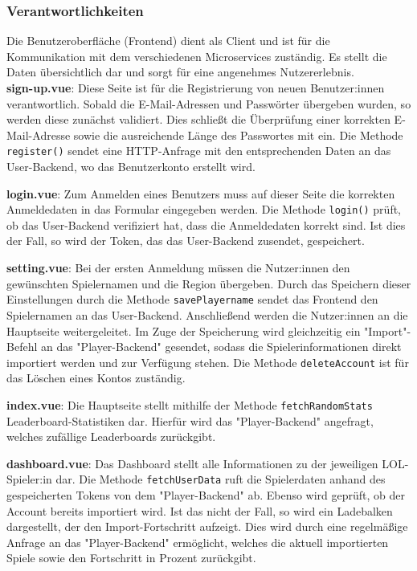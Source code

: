 \subsubsection{Verantwortlichkeiten}

Die Benutzeroberfläche (Frontend) dient als Client und ist für die Kommunikation mit dem verschiedenen Microservices zuständig. Es stellt die Daten übersichtlich dar und sorgt für eine
angenehmes Nutzererlebnis. \\

\textbf{sign-up.vue}: Diese Seite ist für die Registrierung von neuen Benutzer:innen verantwortlich. Sobald die E-Mail-Adressen und Passwörter übergeben wurden, so werden diese zunächst
validiert. Dies schließt die Überprüfung einer korrekten E-Mail-Adresse sowie die ausreichende Länge des Passwortes mit ein. Die Methode \verb|register()| sendet eine HTTP-Anfrage mit den 
entsprechenden Daten an das User-Backend, wo das Benutzerkonto erstellt wird.
\newline

\textbf{login.vue}: Zum Anmelden eines Benutzers muss auf dieser Seite die korrekten Anmeldedaten in das Formular eingegeben werden. Die Methode \verb|login()| prüft, ob das User-Backend
verifiziert hat, dass die Anmeldedaten korrekt sind. Ist dies der Fall, so wird der Token, das das User-Backend zusendet, gespeichert. 
\newline

\textbf{setting.vue}: Bei der ersten Anmeldung müssen die Nutzer:innen den gewünschten Spielernamen und die Region übergeben. Durch das Speichern dieser Einstellungen durch die Methode \verb|savePlayername|
sendet das Frontend den Spielernamen an das User-Backend. Anschließend werden die Nutzer:innen an die Hauptseite weitergeleitet. Im Zuge der Speicherung wird gleichzeitig ein "Import"-Befehl
an das "Player-Backend" gesendet, sodass die Spielerinformationen direkt importiert werden und zur Verfügung stehen. Die Methode \verb|deleteAccount| ist für das Löschen eines Kontos zuständig.
\newline

\textbf{index.vue}: Die Hauptseite stellt mithilfe der Methode \verb|fetchRandomStats| Leaderboard-Statistiken dar. Hierfür wird das "Player-Backend" angefragt, welches zufällige 
Leaderboards zurückgibt.
\newline

\textbf{dashboard.vue}: Das Dashboard stellt alle Informationen zu der jeweiligen LOL-Spieler:in dar. Die Methode \verb|fetchUserData| ruft die Spielerdaten anhand des gespeicherten Tokens
von dem "Player-Backend" ab. Ebenso wird geprüft, ob der Account bereits importiert wird. Ist das nicht der Fall, so wird ein Ladebalken dargestellt, der den Import-Fortschritt aufzeigt. Dies
wird durch eine regelmäßige Anfrage an das "Player-Backend" ermöglicht, welches die aktuell importierten Spiele sowie den Fortschritt in Prozent zurückgibt.
\newline

